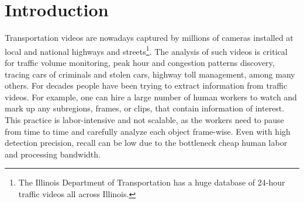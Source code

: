 \section{Introduction}
\label{sec:semantic-intro}

Transportation videos are nowadays captured by millions of cameras installed at local and national highways and streets\footnote{The Illinois Department of Transportation has a huge database of 24-hour traffic videos all across Illinois.}.
The analysis of such videos is critical for traffic volume monitoring, peak hour and congestion patterns discovery, tracing cars of criminals and stolen cars, highway toll management, among many others.
For decades people have been trying to extract information from traffic videos.
For example, one can hire a large number of human workers to watch and mark up any subregions, frames, or clips, that contain information of interest.
This practice is labor-intensive and not scalable,
as the workers need to pause from time to time and carefully analyze each object frame-wise.
Even with high detection precision, recall can be low due to the bottleneck cheap human labor and processing bandwidth.


